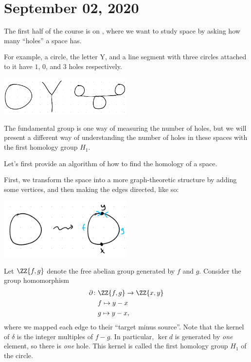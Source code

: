 \documentclass{standalone}
\begin{document}
\chapter{September 02, 2020}
The first half of the course is on , where we want to study
space by asking how many ``holes'' a space has.

For example, a circle, the letter Y, and a line segment with
three circles attached to it have \(1\), \(0\), and \(3\) holes respectively.
\begin{center}
  \includegraphics[width=0.5\textwidth]{18_905-200902-1.png}
\end{center}
The fundamental group is one way of measuring the number of holes, but we will
present a different way of understanding the number of holes in these spaces
with the first homology group \(H_1\).

Let's first provide an algorithm of how to find the homology of a space.
\begin{example}
  First, we transform the space into a more graph-theoretic structure
  by adding some vertices, and then making the edges directed, like so:
  \begin{center}
    \includegraphics[width=0.5\textwidth]{18_905-200902-2.png}
  \end{center}
  Let \(\ZZ\{f, g\}\) denote the free abelian group generated by
  \(f\) and \(g\). Consider the group homomorphism
  \begin{align*}
    \partial \colon &\ZZ\{f, g\} \to \ZZ\{x, y\} \\
      & f \mapsto y - x \\
      & g \mapsto y - x,
  \end{align*}
  where we mapped each edge to their ``target minus source''. Note that
  the kernel of \(\delta\) is the integer multiples of \(f - g\).
  In particular, \(\ker d\) is generated by \emph{one} element,
  so there is \emph{one} hole.
  This kernel is called the first homology group \(H_1\) of the circle.
\end{example}
\end{document}
